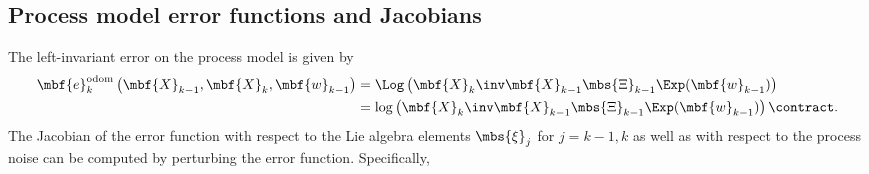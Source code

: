 \documentclass[ nobib, nofonts, notoc]{tufte-handout}
\begin{document}
    \subsection{Process model error functions and Jacobians}
    The left-invariant error on the process model is given by
    \begin{align}
        \mbf{e}^{\mathrm{odom}}_{k}\left(
            \mbf{X}_{k-1},
            \mbf{X}_{k},
            \mbf{w}_{k-1}
        \right)
        &=
        \Log
        \left(
            \mbf{X}_{k}\inv
            \mbf{X}_{k-1}
            \mbs{\Xi}_{k-1}
            \Exp(\mbf{w}_{k-1})
        \right)\\
        &=
        \log
        \left(
            \mbf{X}_{k}\inv
            \mbf{X}_{k-1}
            \mbs{\Xi}_{k-1}
            \Exp(\mbf{w}_{k-1})
        \right)
            \contract.
    \end{align}
    The Jacobian of the error function with respect to the Lie algebra elements $\mbs{\xi}_{j}$ for $j=k - 1, k$ as well as with respect to the process noise can be computed by perturbing the error function.
    Specifically,
\end{document}
